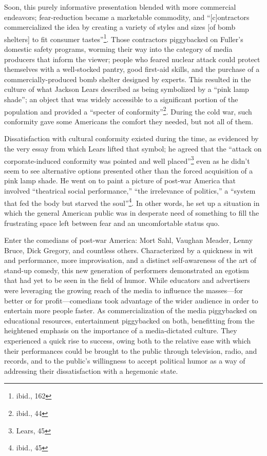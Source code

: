 Soon, this purely informative presentation blended with more commercial
endeavors; fear-reduction became a marketable commodity, and ``[c]ontractors
commercialized the idea by creating a variety of styles and sizes [of bomb
shelters] to fit consumer tastes''\footnote{ibid., 162}. Those contractors
piggybacked on Fuller's domestic safety programs, worming their way into the
category of media producers that inform the viewer; people who feared nuclear
attack could protect themselves with a well-stocked pantry, good first-aid
skills, and the purchase of a commercially-produced bomb shelter designed by
experts. This resulted in the culture of what Jackson Lears described as being
symbolized by a ``pink lamp shade''; an object that was widely accessible to a
significant portion of the population and provided a ``specter of
conformity''\footnote{ibid., 44}. During the cold war, such conformity gave some
Americans the comfort they needed, but not all of them.

Dissatisfaction with cultural conformity existed during the time, as evidenced
by the very essay from which Lears lifted that symbol; he agreed that the
``attack on corporate-induced conformity was pointed and well
placed''\footnote{Lears, 45} even as he didn't seem to see alternative options
presented other than the forced acquisition of a pink lamp shade. He went on to
paint a picture of post-war America that involved ``theatrical social
performance,'' ``the irrelevance of politics,'' a ``system that fed the body but
starved the soul''\footnote{ibid., 45}. In other words, he set up a situation in
which the general American public was in desperate need of something to fill the
frustrating space left between fear and an uncomfortable status quo.

Enter the comedians of post-war America: Mort Sahl, Vaughan Meader, Lenny Bruce,
Dick Gregory, and countless others. Characterized by a quickness in wit and
performance, more improvisation, and a distinct self-awareness of the art of
stand-up comedy, this new generation of performers demonstrated an egotism that
had yet to be seen in the field of humor. While educators and advertisers were
leveraging the growing reach of the media to influence the masses—for better or
for profit—comedians took advantage of the wider audience in order to entertain
more people faster. As commercialization of the media piggybacked on educational
resources, entertainment piggybacked on both, benefitting from the heightened
emphasis on the importance of a media-dictated culture. They experienced a quick
rise to success, owing both to the relative ease with which their performances
could be brought to the public through television, radio, and records, and to
the public's willingness to accept political humor as a way of addressing their
dissatisfaction with a hegemonic state.

